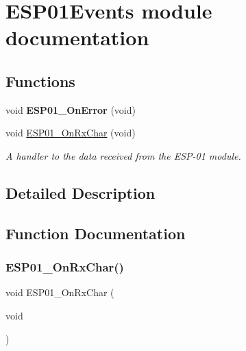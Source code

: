 \hypertarget{group___e_s_p01_events__module}{}\section{E\+S\+P01\+Events module documentation}
\label{group___e_s_p01_events__module}
\subsection*{Functions}
\begin{DoxyCompactItemize}
\item 
\mbox{\label{group___e_s_p01_events__module_gae7f1ce423319112fcaf30c04f022fbcf}} 
void {\bfseries E\+S\+P01\+\_\+\+On\+Error} (void)
\item 
void \hyperlink{group___e_s_p01_events__module_gaec687318189ea94eaacd3d02c8c7c142}{E\+S\+P01\+\_\+\+On\+Rx\+Char} (void)
\begin{DoxyCompactList}\small\item\em A handler to the data received from the E\+S\+P-\/01 module. \end{DoxyCompactList}\end{DoxyCompactItemize}


\subsection{Detailed Description}


\subsection{Function Documentation}
\mbox{\label{group___e_s_p01_events__module_gaec687318189ea94eaacd3d02c8c7c142}} 
\subsubsection{\texorpdfstring{E\+S\+P01\+\_\+\+On\+Rx\+Char()}{ESP01\_OnRxChar()}}
{\footnotesize\ttfamily void E\+S\+P01\+\_\+\+On\+Rx\+Char (\begin{DoxyParamCaption}\item[{void}]{ }\end{DoxyParamCaption})}



